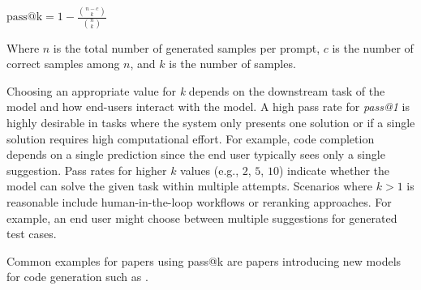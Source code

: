 $\text{pass@k} = 1 - \frac{\binom{n-c}{k}}{\binom{n}{k}}$

Where $n$ is the total number of generated samples per prompt, $c$ is the number of correct samples among  $n$, and $k$ is the number of samples.

Choosing an appropriate value for \emph{k} depends on the downstream task of the model and how end-users interact with the model.
A high pass rate for \emph{pass@1} is highly desirable in tasks where the system only presents one solution or if a single solution requires high computational effort.
For example, code completion depends on a single prediction since the end user typically sees only a single suggestion.
Pass rates for higher $k$ values (e.g., $2$, $5$, $10$) indicate whether the model can solve the given task within multiple attempts.
Scenarios where $k>1$ is reasonable include human-in-the-loop workflows or reranking approaches.
For example, an end user might choose between multiple suggestions for generated test cases.




Common examples for papers using pass@k are papers introducing new models for code generation such as \cite{DBLP:journals/corr/abs-2308-12950, DBLP:journals/corr/abs-2401-14196, DBLP:journals/corr/abs-2409-12186, DBLP:journals/corr/abs-2305-06161}.

